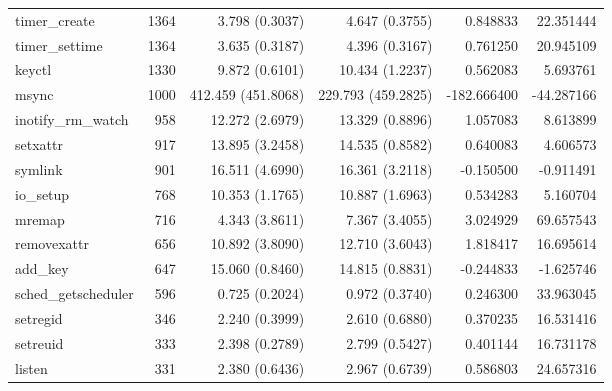 \begin{longtable}{>{\ttfamily}lrrrrr}
                  timer\_create &       1364 &           3.798 (0.3037) &           4.647 (0.3755) &        0.848833 &    22.351444 \\
                 timer\_settime &       1364 &           3.635 (0.3187) &           4.396 (0.3167) &        0.761250 &    20.945109 \\
                         keyctl &       1330 &           9.872 (0.6101) &          10.434 (1.2237) &        0.562083 &     5.693761 \\
                          msync &       1000 &       412.459 (451.8068) &       229.793 (459.2825) &     -182.666400 &   -44.287166 \\
             inotify\_rm\_watch &        958 &          12.272 (2.6979) &          13.329 (0.8896) &        1.057083 &     8.613899 \\
                       setxattr &        917 &          13.895 (3.2458) &          14.535 (0.8582) &        0.640083 &     4.606573 \\
                        symlink &        901 &          16.511 (4.6990) &          16.361 (3.2118) &       -0.150500 &    -0.911491 \\
                      io\_setup &        768 &          10.353 (1.1765) &          10.887 (1.6963) &        0.534283 &     5.160704 \\
                         mremap &        716 &           4.343 (3.8611) &           7.367 (3.4055) &        3.024929 &    69.657543 \\
                    removexattr &        656 &          10.892 (3.8090) &          12.710 (3.6043) &        1.818417 &    16.695614 \\
                       add\_key &        647 &          15.060 (0.8460) &          14.815 (0.8831) &       -0.244833 &    -1.625746 \\
            sched\_getscheduler &        596 &           0.725 (0.2024) &           0.972 (0.3740) &        0.246300 &    33.963045 \\
                       setregid &        346 &           2.240 (0.3999) &           2.610 (0.6880) &        0.370235 &    16.531416 \\
                       setreuid &        333 &           2.398 (0.2789) &           2.799 (0.5427) &        0.401144 &    16.731178 \\
                         listen &        331 &           2.380 (0.6436) &           2.967 (0.6739) &        0.586803 &    24.657316 \\

\end{longtable}
